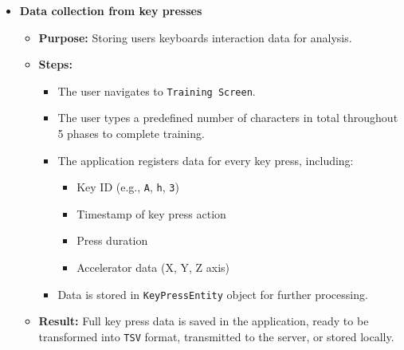 \begin{itemize}
	\item \textbf{Data collection from key presses}
	\begin{itemize}
		\item \textbf{Purpose:} Storing users keyboards interaction data for analysis.
		\item \textbf{Steps:}
		\begin{itemize}
			\item The user navigates to \texttt{Training Screen}.
			\item The user types a predefined number of characters in total throughout 5 phases to complete training.
			\item The application registers data for every key press, including:
			\begin{itemize}
				\item Key ID (e.g., \texttt{A}, \texttt{h}, \texttt{3})
				\item Timestamp of key press action
				\item Press duration
				\item Accelerator data (X, Y, Z axis)
			\end{itemize}
			\item Data is stored in \texttt{KeyPressEntity} object for further processing.
		\end{itemize}
		\item \textbf{Result:} Full key press data is saved in the application, ready to be transformed into \texttt{TSV} format, transmitted to the server, or stored locally.
	\end{itemize}
	

\end{itemize}
